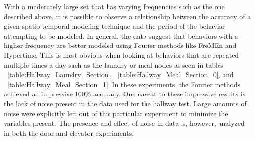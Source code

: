 With a moderately large set that has varying frequencies such as the one
described above, it is possible to observe a relationship between the accuracy
of a given spatio-temporal modeling technique and the period of the behavior
attempting to be modeled. In general, the data suggest that behaviors with
a higher frequency are better modeled using Fourier methods like FreMEn and
Hypertime. This is most obvious when looking at behaviors that are repeated multiple
times a day such as the laundry or meal nodes as seen in tables
~\ref{table:Hallway_Laundry_Section},
~\ref{table:Hallway_Meal_Section_0}, and
~\ref{table:Hallway_Meal_Section_1}. In these experiments, the Fourier
methods achieved an impressive 100\% accuracy.
One caveat to these impressive results is the lack of noise
present in the data used for the hallway test. Large amounts of noise were
explicitly left out of this particular experiment to minimize the variables
present. The presence and effect of noise in data is, however, analyzed in
both the door and elevator experiments. \\

\begin{table}[h!]
  \centering
  \caption{Hallway Laundry Section}
  \label{table:Hallway_Laundry_Section}
\end{table}

\begin{table}[h!]
  \centering
  \caption{Hallway Meal Section 0}
  \label{table:Hallway_Meal_Section_0}
\end{table}

